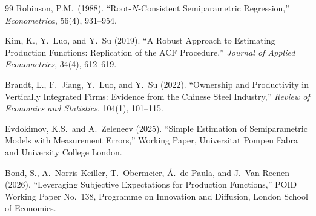 \documentclass[11pt]{article}
\begin{document}
\begin{thebibliography}{99}
 Robinson, P.M.\ (1988). ``Root-$N$-Consistent Semiparametric Regression,'' \emph{Econometrica}, 56(4), 931--954.

 Kim, K., Y.\ Luo, and Y.\ Su (2019). ``A Robust Approach to Estimating Production Functions: Replication of the ACF Procedure,'' \emph{Journal of Applied Econometrics}, 34(4), 612--619.

 Brandt, L., F.\ Jiang, Y.\ Luo, and Y.\ Su (2022). ``Ownership and Productivity in Vertically Integrated Firms: Evidence from the Chinese Steel Industry,'' \emph{Review of Economics and Statistics}, 104(1), 101--115.

 Evdokimov, K.S.\ and A.\ Zeleneev (2025). ``Simple Estimation of Semiparametric Models with Measurement Errors,'' Working Paper, Universitat Pompeu Fabra and University College London.

 Bond, S., A.\ Norris-Keiller, T.\ Obermeier, \'A.\ de Paula, and J.\ Van Reenen (2026). ``Leveraging Subjective Expectations for Production Functions,'' POID Working Paper No.~138, Programme on Innovation and Diffusion, London School of Economics.

\end{thebibliography}
\endgroup
\end{document}
